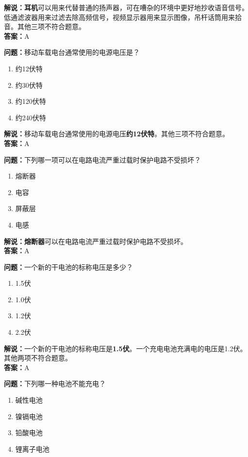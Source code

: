 \textbf{解说：耳机}可以用来代替普通的扬声器，可在嘈杂的环境中更好地抄收语音信号。低通滤波器用来过滤去除高频信号，视频显示器用来显示图像，吊杆话筒用来拾音。其他三项不符合题意。\\\textbf{答案：}A%


\textbf{问题：}移动车载电台通常使用的电源电压是？

\begin{enumerate}[label=\Alph*), leftmargin=1cm]
	\item 约12伏特
	\item 约30伏特
	\item 约120伏特
	\item 约240伏特
\end{enumerate}

\textbf{解说：}移动车载电台通常使用的电源电压\textbf{约12伏特}。其他三项不符合题意。\\\textbf{答案：}A


\textbf{问题：}下列哪一项可以在电路电流严重过载时保护电路不受损坏？

\begin{enumerate}[label=\Alph*), leftmargin=1cm]
	\item 熔断器
	\item 电容
	\item 屏蔽层
	\item 电感
\end{enumerate}

\textbf{解说：熔断器}可以在电路电流严重过载时保护电路不受损坏。\\\textbf{答案：}A%

\textbf{问题：}一个新的干电池的标称电压是多少？

\begin{enumerate}[label=\Alph*), leftmargin=1cm]
	\item 1.5伏
	\item 1.0伏
	\item 1.2伏
	\item 2.2伏
\end{enumerate}

\textbf{解说：}一个新的干电池的标称电压是\textbf{1.5伏}。一个充电电池充满电的电压是1.2伏。其他两项不符合题意。\\\textbf{答案：}A%


\textbf{问题：}下列哪一种电池不能充电？

\begin{enumerate}[label=\Alph*), leftmargin=1cm]
	\item 碱性电池
	\item 镍镉电池
	\item 铅酸电池
	\item 锂离子电池
\end{enumerate}


